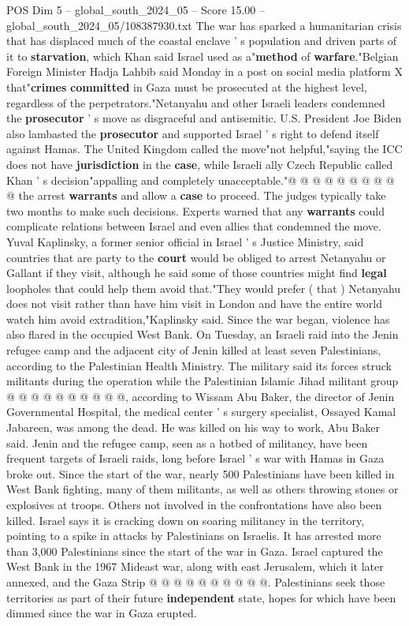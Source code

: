 \begin{textsample}{POS Dim 5 – global\_south\_2024\_05 – Score 15.00 – global\_south\_2024\_05/108387930.txt}
The war has sparked a humanitarian crisis that has displaced much of the coastal enclave ' s population and driven parts of it to \textbf{starvation}, which Khan said Israel used as a"\textbf{method} of \textbf{warfare}."Belgian Foreign Minister Hadja Lahbib said Monday in a post on social media platform X that"\textbf{crimes} \textbf{committed} in Gaza must be prosecuted at the highest level, regardless of the perpetrators."Netanyahu and other Israeli leaders condemned the \textbf{prosecutor} ' s move as disgraceful and antisemitic.
U.S.
President Joe Biden also lambasted the \textbf{prosecutor} and supported Israel ' s right to defend itself against Hamas.
The United Kingdom called the move"not helpful,"saying the ICC does not have \textbf{jurisdiction} in the \textbf{case}, while Israeli ally Czech Republic called Khan ' s decision"appalling and completely unacceptable."@ @ @ @ @ @ @ @ @ @ the arrest \textbf{warrants} and allow a \textbf{case} to proceed.
The judges typically take two months to make such decisions.
Experts warned that any \textbf{warrants} could complicate relations between Israel and even allies that condemned the move.
Yuval Kaplinsky, a former senior official in Israel ' s Justice Ministry, said countries that are party to the \textbf{court} would be obliged to arrest Netanyahu or Gallant if they visit, although he said some of those countries might find \textbf{legal} loopholes that could help them avoid that."They would prefer ( that ) Netanyahu does not visit rather than have him visit in London and have the entire world watch him avoid extradition,"Kaplinsky said.
Since the war began, violence has also flared in the occupied West Bank.
On Tuesday, an Israeli raid into the Jenin refugee camp and the adjacent city of Jenin killed at least seven Palestinians, according to the Palestinian Health Ministry.
The military said its forces struck militants during the operation while the Palestinian Islamic Jihad militant group @ @ @ @ @ @ @ @ @ @, according to Wissam Abu Baker, the director of Jenin Governmental Hospital, the medical center ' s surgery specialist, Ossayed Kamal Jabareen, was among the dead.
He was killed on his way to work, Abu Baker said.
Jenin and the refugee camp, seen as a hotbed of militancy, have been frequent targets of Israeli raids, long before Israel ' s war with Hamas in Gaza broke out.
Since the start of the war, nearly 500 Palestinians have been killed in West Bank fighting, many of them militants, as well as others throwing stones or explosives at troops.
Others not involved in the confrontations have also been killed.
Israel says it is cracking down on soaring militancy in the territory, pointing to a spike in attacks by Palestinians on Israelis.
It has arrested more than 3,000 Palestinians since the start of the war in Gaza.
Israel captured the West Bank in the 1967 Mideast war, along with east Jerusalem, which it later annexed, and the Gaza Strip @ @ @ @ @ @ @ @ @ @.
Palestinians seek those territories as part of their future \textbf{independent} state, hopes for which have been dimmed since the war in Gaza erupted.


\end{textsample}
